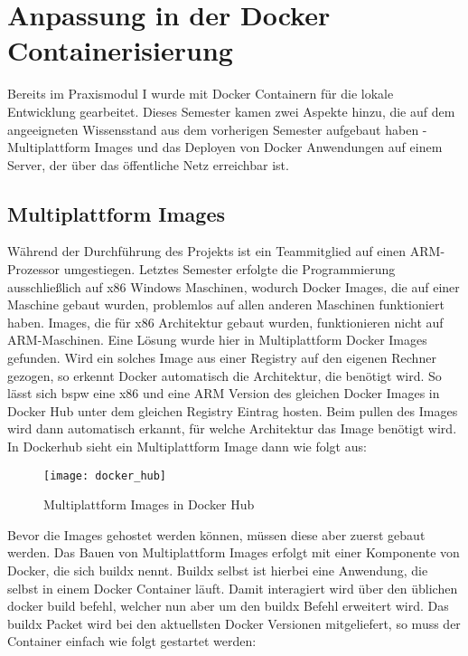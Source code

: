 \section{Anpassung in der Docker Containerisierung}\label{subsec:docker-containerisierung}

Bereits im Praxismodul I wurde mit Docker Containern für die lokale Entwicklung gearbeitet.
Dieses Semester kamen zwei Aspekte hinzu, die auf dem angeeigneten Wissensstand aus dem vorherigen Semester aufgebaut haben - Multiplattform Images und das Deployen von Docker Anwendungen auf einem Server, der über das öffentliche Netz erreichbar ist.

\subsection{Multiplattform Images}\label{subsubsec:multiplattform-images}
Während der Durchführung des Projekts ist ein Teammitglied auf einen ARM-Prozessor umgestiegen.
Letztes Semester erfolgte die Programmierung ausschließlich auf x86 Windows Maschinen, wodurch Docker Images, die auf einer Maschine gebaut wurden, problemlos auf allen anderen Maschinen funktioniert haben.
Images, die für x86 Architektur gebaut wurden, funktionieren nicht auf ARM-Maschinen.
Eine Lösung wurde hier in Multiplattform Docker Images gefunden.
Wird ein solches Image aus einer Registry auf den eigenen Rechner gezogen, so erkennt Docker automatisch die Architektur, die benötigt wird.
So lässt sich bspw eine x86 und eine ARM Version des gleichen Docker Images in Docker Hub unter dem gleichen Registry Eintrag hosten.
Beim pullen des Images wird dann automatisch erkannt, für welche Architektur das Image benötigt wird.
In Dockerhub sieht ein Multiplattform Image dann wie folgt aus:

\begin{figure}[h]
  \centering
  \texttt{[image: docker\_hub]}
  \caption{Multiplattform Images in Docker Hub}
  \label{fig:docker_hub}
\end{figure}

Bevor die Images gehostet werden können, müssen diese aber zuerst gebaut werden.
Das Bauen von Multiplattform Images erfolgt mit einer Komponente von Docker, die sich buildx nennt.
Buildx selbst ist hierbei eine Anwendung, die selbst in einem Docker Container läuft.
Damit interagiert wird über den üblichen docker build befehl, welcher nun aber um den buildx Befehl erweitert wird.
Das buildx Packet wird bei den aktuellsten Docker Versionen mitgeliefert, so muss der Container einfach wie folgt gestartet werden:


